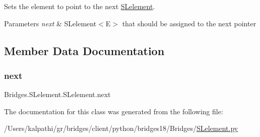 Sets the element to point to the next \mbox{\hyperlink{class_bridges_1_1_s_lelement_1_1_s_lelement}{S\+Lelement}}. 


\begin{DoxyParams}{Parameters}
{\em next} & S\+Lelement$<$\+E$>$ that should be assigned to the next pointer \\
\hline
\end{DoxyParams}


\subsection{Member Data Documentation}
\mbox{\label{class_bridges_1_1_s_lelement_1_1_s_lelement_a650935f5a68b49de4c222cc4c8b0c778}} 
\subsubsection{\texorpdfstring{next}{next}}
{\footnotesize\ttfamily Bridges.\+S\+Lelement.\+S\+Lelement.\+next}



The documentation for this class was generated from the following file\+:\begin{DoxyCompactItemize}
\item 
/\+Users/kalpathi/gr/bridges/client/python/bridges18/\+Bridges/\mbox{\hyperlink{_s_lelement_8py}{S\+Lelement.\+py}}\end{DoxyCompactItemize}
